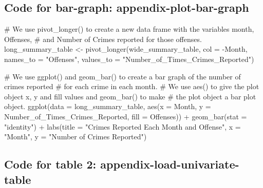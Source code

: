 \documentclass[
]{article}
\newenvironment{Shaded}{}{}
\newcommand{\AttributeTok}[1]{#1}
\newcommand{\CommentTok}[1]{\textcolor[rgb]{0.00,0.50,0.00}{#1}}
\newcommand{\FunctionTok}[1]{#1}
\newcommand{\NormalTok}[1]{#1}
\newcommand{\OtherTok}[1]{\textcolor[rgb]{1.00,0.25,0.00}{#1}}
\newcommand{\SpecialCharTok}[1]{\textcolor[rgb]{0.00,0.50,0.50}{#1}}
\newcommand{\StringTok}[1]{\textcolor[rgb]{0.00,0.50,0.50}{#1}}
\begin{document}
\subsection{Code for bar-graph:
appendix-plot-bar-graph}\label{code-for-bar-graph-appendix-plot-bar-graph}

\begin{Shaded}
\begin{Highlighting}[]
\CommentTok{\# We use pivot\_longer() to create a new data frame with the variables month, Offenses, }
\CommentTok{\# and Number of Crimes reported for those offenses.}
\NormalTok{long\_summary\_table }\OtherTok{\textless{}{-}} \FunctionTok{pivot\_longer}\NormalTok{(wide\_summary\_table, }
                                   \AttributeTok{col =} \SpecialCharTok{{-}}\NormalTok{Month, }
                                   \AttributeTok{names\_to =} \StringTok{"Offenses"}\NormalTok{, }
                                   \AttributeTok{values\_to =} \StringTok{"Number\_of\_Times\_Crimes\_Reported"}\NormalTok{)}

\CommentTok{\# We use ggplot() and geom\_bar() to create a bar graph of the number of crimes reported }
\CommentTok{\# for each crime in each month.}
\CommentTok{\# We use aes() to give the plot object x, y and fill values and geom\_bar() to make }
\CommentTok{\# the plot object a bar plot object.}
\FunctionTok{ggplot}\NormalTok{(}\AttributeTok{data =}\NormalTok{ long\_summary\_table, }
       \FunctionTok{aes}\NormalTok{(}\AttributeTok{x =}\NormalTok{ Month, }\AttributeTok{y =}\NormalTok{ Number\_of\_Times\_Crimes\_Reported, }\AttributeTok{fill =}\NormalTok{ Offenses)) }\SpecialCharTok{+} 
  \FunctionTok{geom\_bar}\NormalTok{(}\AttributeTok{stat =} \StringTok{"identity"}\NormalTok{) }\SpecialCharTok{+} 
  \FunctionTok{labs}\NormalTok{(}\AttributeTok{title =} \StringTok{"Crimes Reported Each Month and Offense"}\NormalTok{,}
       \AttributeTok{x =} \StringTok{"Month"}\NormalTok{,}
       \AttributeTok{y =} \StringTok{"Number of Crimes Reported"}\NormalTok{)}
\end{Highlighting}
\end{Shaded}

\subsection{Code for table 2:
appendix-load-univariate-table}\label{code-for-table-2-appendix-load-univariate-table}
\end{document}

